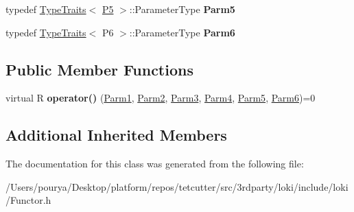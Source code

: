 \begin{DoxyCompactItemize}
\item 
\hypertarget{classLoki_1_1FunctorImpl_3_01R_00_01Seq_3_01P1_00_01P2_00_01P3_00_01P4_00_01P5_00_01P6_01_4_00_01ThreadingModel_01_4_aec9b595830866e05bf13ef7a736c6826}{}typedef \hyperlink{classLoki_1_1TypeTraits}{Type\+Traits}$<$ \hyperlink{structP5}{P5} $>$\+::Parameter\+Type {\bfseries Parm5}\label{classLoki_1_1FunctorImpl_3_01R_00_01Seq_3_01P1_00_01P2_00_01P3_00_01P4_00_01P5_00_01P6_01_4_00_01ThreadingModel_01_4_aec9b595830866e05bf13ef7a736c6826}

\item 
\hypertarget{classLoki_1_1FunctorImpl_3_01R_00_01Seq_3_01P1_00_01P2_00_01P3_00_01P4_00_01P5_00_01P6_01_4_00_01ThreadingModel_01_4_a8cfbf8a95c428f223e58435425f4281c}{}typedef \hyperlink{classLoki_1_1TypeTraits}{Type\+Traits}$<$ P6 $>$\+::Parameter\+Type {\bfseries Parm6}\label{classLoki_1_1FunctorImpl_3_01R_00_01Seq_3_01P1_00_01P2_00_01P3_00_01P4_00_01P5_00_01P6_01_4_00_01ThreadingModel_01_4_a8cfbf8a95c428f223e58435425f4281c}

\end{DoxyCompactItemize}
\subsection*{Public Member Functions}
\begin{DoxyCompactItemize}
\item 
\hypertarget{classLoki_1_1FunctorImpl_3_01R_00_01Seq_3_01P1_00_01P2_00_01P3_00_01P4_00_01P5_00_01P6_01_4_00_01ThreadingModel_01_4_a7262bc0f1292483c49797e2c2b1d1ba3}{}virtual R {\bfseries operator()} (\hyperlink{classLoki_1_1EmptyType}{Parm1}, \hyperlink{classLoki_1_1EmptyType}{Parm2}, \hyperlink{classLoki_1_1EmptyType}{Parm3}, \hyperlink{classLoki_1_1EmptyType}{Parm4}, \hyperlink{classLoki_1_1EmptyType}{Parm5}, \hyperlink{classLoki_1_1EmptyType}{Parm6})=0\label{classLoki_1_1FunctorImpl_3_01R_00_01Seq_3_01P1_00_01P2_00_01P3_00_01P4_00_01P5_00_01P6_01_4_00_01ThreadingModel_01_4_a7262bc0f1292483c49797e2c2b1d1ba3}

\end{DoxyCompactItemize}
\subsection*{Additional Inherited Members}


The documentation for this class was generated from the following file\+:\begin{DoxyCompactItemize}
\item 
/\+Users/pourya/\+Desktop/platform/repos/tetcutter/src/3rdparty/loki/include/loki/Functor.\+h\end{DoxyCompactItemize}
